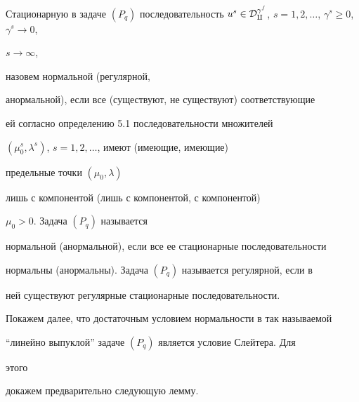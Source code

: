 \begin{defns} 


Стационарную в задаче $(P_q)$ последовательность $u^s\in\cal 


D^{\gamma^s}_q$, $s=1,2,\dotsc$, $\gamma^s\ge0$, $\gamma^s\to0$, 


$s\to\infty$, 


назовем нормальной (регулярной, 


анормальной), если все (существуют, не существуют) соответствующие 


ей согласно определению 5.1 последовательности множителей


$(\mu^s_0,\lambda^s)$, $s=1,2,\dotsc$, имеют (имеющие, имеющие)


предельные точки $(\mu_0,\lambda)$ 


лишь с компонентой (лишь с компонентой, с компонентой)


$\mu_0>0$. Задача $(P_q)$ называется 


нормальной (анормальной), если все ее стационарные последовательности 


нормальны (анормальны). Задача $(P_q)$ называется регулярной, если в 


ней существуют регулярные стационарные последовательности. 


\end{defns} 


 


Покажем далее, что достаточным условием нормальности в так называемой 


``линейно выпуклой'' задаче $(P_q)$ является условие Слейтера. Для 


этого 


докажем предварительно следующую лемму. 


 


